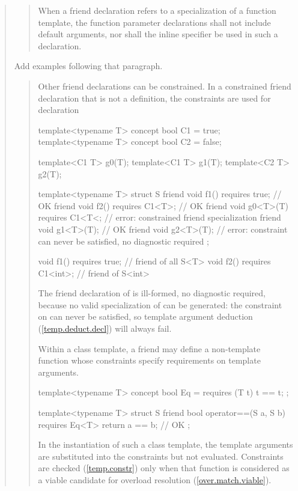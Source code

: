 \begin{quote}
\begin{quote}
\setcounter{Paras}{8}
\pnum
When a friend declaration refers to a specialization of a function
template, the function parameter declarations shall not include
default arguments,  nor shall the inline specifier be used in such a
declaration.
\end{quote}

Add examples following that paragraph.

\begin{quote}
\begin{addedblock}
\pnum
\enternote
Other friend declarations can be constrained. In a constrained friend 
declaration that is not a definition, the constraints are used for declaration
\exitnote
\enterexample
\begin{codeblock}
template<typename T> concept bool C1 = true;
template<typename T> concept bool C2 = false;

template<C1 T> g0(T);
template<C1 T> g1(T);
template<C2 T> g2(T);

template<typename T>
  struct S {
    friend void f1() requires true;      // OK
    friend void f2() requires C1<T>;     // OK
    friend void g0<T>(T) requires C1<T<; // error: constrained friend specialization
    friend void g1<T>(T);                // OK
    friend void g2<T>(T);                // error: constraint can never be satisfied, no diagnostic required
  };

void f1() requires true;    // friend of all S<T>
void f2() requires C1<int>; // friend of S<int>
\end{codeblock}
The friend declaration of  is ill-formed, no
diagnostic required, because no valid specialization of 
can be generated: the constraint on  can never
be satisfied, so template argument deduction
(\ref{temp.deduct.decl}) will always fail.
\exitexample

\pnum
\enternote
Within a class template, a friend may define a non-template function
whose constraints specify requirements on template arguments.
\enterexample
\begin{codeblock}
template<typename T> concept bool Eq = requires (T t) { t == t; };

template<typename T>
  struct S {
    friend bool operator==(S a, S b) requires Eq<T> { return a == b; } // OK
  };
\end{codeblock}
\exitexample
In the instantiation of such a class template, the template
arguments are substituted into the constraints but not evaluated.
Constraints are checked (\ref{temp.constr}) only when
that function is considered as a viable candidate for overload resolution
(\ref{over.match.viable}).
\exitnote
\end{addedblock}
\end{quote}



\end{quote}
